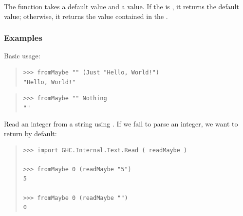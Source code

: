 \begin{haddockdesc}
\item[\begin{tabular}{@{}l}
fromMaybe :: a -> Maybe a -> a
\end{tabular}]
{\haddockbegindoc
The  function takes a default value and a 
 value.  If the  is , it returns the default value;
 otherwise, it returns the value contained in the .\par
\subsubsection*{\textbf{Examples}}
Basic usage:\par
\begin{quote}
{\haddockverb\begin{verbatim}
>>> fromMaybe "" (Just "Hello, World!")
"Hello, World!"

\end{verbatim}}
\end{quote}
\begin{quote}
{\haddockverb\begin{verbatim}
>>> fromMaybe "" Nothing
""

\end{verbatim}}
\end{quote}
Read an integer from a string using . If we fail to
 parse an integer, we want to return  by default:\par
\begin{quote}
{\haddockverb\begin{verbatim}
>>> import GHC.Internal.Text.Read ( readMaybe )

>>> fromMaybe 0 (readMaybe "5")
5

>>> fromMaybe 0 (readMaybe "")
0

\end{verbatim}}
\end{quote}}
\end{haddockdesc}
